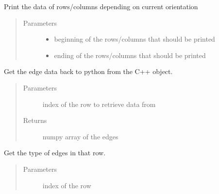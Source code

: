 \documentclass[a4paper,10pt,english]{sphinxmanual}
\begin{document}
\begin{fulllineitems}

\begin{fulllineitems}
\label{\detokenize{drc:drc.drc.slcleaner.PyDrcSl.printvector}}
Print the data of rows/columns depending on current orientation
\begin{quote}\begin{description}
\item[{Parameters}] \leavevmode\begin{itemize}
\item {} 
 \textendash{} beginning of the rows/columns that should be printed

\item {} 
 \textendash{} ending of the rows/columns that should be printed

\end{itemize}

\end{description}\end{quote}

\end{fulllineitems}


\begin{fulllineitems}
\label{\detokenize{drc:drc.drc.slcleaner.PyDrcSl.get_row}}
Get the edge data back to python from the C++ object.
\begin{quote}\begin{description}
\item[{Parameters}] \leavevmode
{} \textendash{} index of the row to retrieve data from

\item[{Returns}] \leavevmode
numpy array of the edges

\end{description}\end{quote}

\end{fulllineitems}


\begin{fulllineitems}
\label{\detokenize{drc:drc.drc.slcleaner.PyDrcSl.get_row_types}}
Get the type of edges in that row.
\begin{quote}\begin{description}
\item[{Parameters}] \leavevmode
{} \textendash{} index of the row


\end{description}
\end{quote}
\end{fulllineitems}
\end{fulllineitems}
\end{document}
